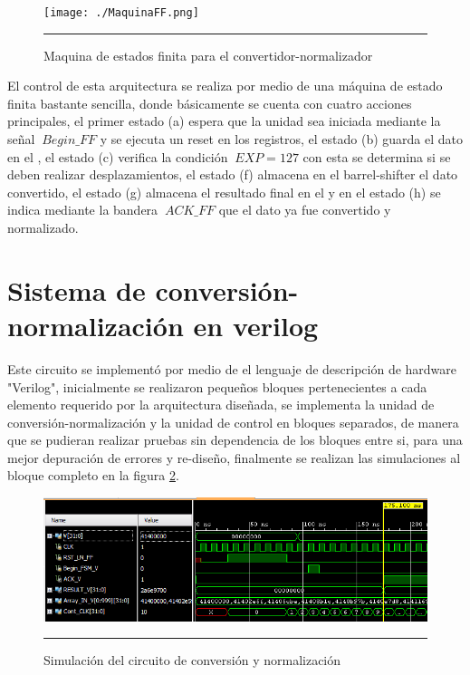 \begin{figure}[H]
  \centering
    \texttt{[image: ./MaquinaFF.png]}
    \rule{35em}{0.5pt}
  \caption[Maquina de estados finita para el convetidor-normalizador]{Maquina de estados finita para el convertidor-normalizador}
  \label{fig:CTRLNORM}
\end{figure} 

El control de esta arquitectura se realiza por medio de una máquina de estado finita bastante sencilla, donde básicamente se cuenta con cuatro acciones principales, el primer estado (a) espera que la unidad sea iniciada mediante la señal $\ Begin\_FF$ y se ejecuta un reset en los registros, el estado (b) guarda el dato en el , el estado (c) verifica la condición $\ EXP=127 $ con esta se determina si se deben realizar desplazamientos, el estado (f) almacena en el barrel-shifter el dato convertido, el estado (g) almacena el resultado final en el  y en el estado (h) se indica mediante la bandera $\ ACK\_FF$ que el dato ya fue convertido y normalizado.

\section{Sistema de conversión-normalización en verilog}

Este circuito se implementó por medio de el lenguaje de descripción de hardware "Verilog", inicialmente se realizaron pequeños bloques pertenecientes a cada elemento requerido por la arquitectura diseñada, se implementa la unidad de conversión-normalización y la unidad de control en bloques separados, de manera que se pudieran realizar pruebas sin dependencia de los bloques entre si, para una mejor depuración de errores y re-diseño, finalmente se realizan las simulaciones al bloque completo en la figura \ref{fig:SIMNORM}. 

\begin{figure}[H]
  \centering
    \includegraphics[scale=0.8]{./TEST_CONV_NOM_I.png}
    \rule{35em}{0.5pt}
  \caption[Simulación del circuito de conversión y normalización]{Simulación del circuito de conversión y normalización}
  \label{fig:SIMNORM}
\end{figure}


